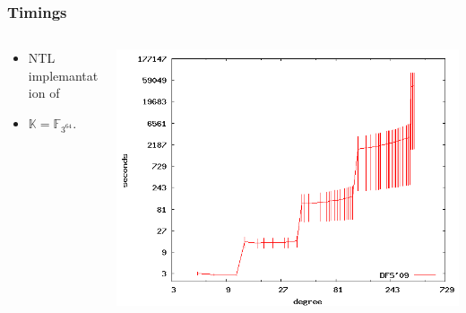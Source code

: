 \documentclass[10pt]{beamer}
\newcommand{\K}{\mathbb{K}}  %
\newcommand{\F}{\mathbb{F}}  %
\newcommand{\0}{\mathcal{O}}  %
\begin{document}
\begin{frame}
  \frametitle{Timings}

  
  \begin{columns}
    \begin{column}{0.4\textwidth}
      \begin{itemize}
      \item NTL implemantation of \cite{DFS09}
      \item $\K = \F_{3^{64}}$.
      \end{itemize}
    \end{column}
    \begin{column}{0.6\textwidth}
             {\includegraphics[width=\textwidth]{3-64}}


\end{column}
\end{columns}
\end{frame}
\end{document}
